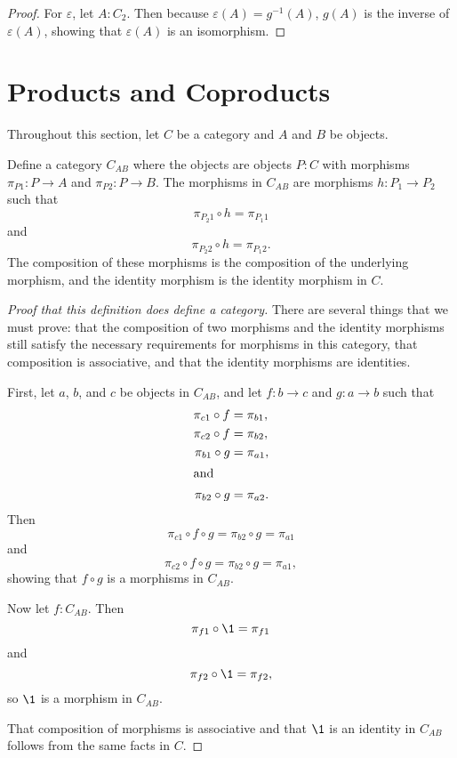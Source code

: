 \documentclass[../math.tex]{subfiles}
\begin{document}
\begin{proof}
    For $\varepsilon$, let $A : C_2$.  Then because $\varepsilon(A) =
    g^{-1}(A)$, $g(A)$ is the inverse of $\varepsilon(A)$, showing that
    $\varepsilon(A)$ is an isomorphism.
\end{proof}

\section{Products and Coproducts}

Throughout this section, let $C$ be a category and $A$ and $B$ be objects.

\begin{definition}
    Define a category $C_{AB}$ where the objects are objects $P : C$ with
    morphisms $\pi_{P1} : P \to A$ and $\pi_{P2} : P \to B$.  The morphisms in
    $C_{AB}$ are morphisms $h : P_1 \to P_2$ such that
    \[
        \pi_{P_2 1} \circ h = \pi_{P_1 1}
    \]
    and
    \[
        \pi_{P_2 2} \circ h = \pi_{P_1 2}.
    \]
    The composition of these morphisms is the composition of the underlying
    morphism, and the identity morphism is the identity morphism in $C$.
\end{definition}
\begin{proof}[Proof that this definition does define a category]
    There are several things that we must prove: that the composition of two
    morphisms and the identity morphisms still satisfy the necessary
    requirements for morphisms in this category, that composition is
    associative, and that the identity morphisms are identities.

    First, let $a$, $b$, and $c$ be objects in $C_{AB}$, and let $f : b \to c$
    and $g : a \to b$ such that
    \begin{align*}
        \pi_{c1} \circ f &= \pi_{b1}, \\
        \pi_{c2} \circ f &= \pi_{b2}, \\
        \pi_{b1} \circ g &= \pi_{a1}, \\
    \intertext{and}
        \pi_{b2} \circ g &= \pi_{a2}.
    \end{align*}
    Then
    \[
        \pi_{c1} \circ f \circ g = \pi_{b2} \circ g = \pi_{a1}
    \]
    and
    \[
        \pi_{c2} \circ f \circ g = \pi_{b2} \circ g = \pi_{a1},
    \]
    showing that $f \circ g$ is a morphisms in $C_{AB}$.

    Now let $f : C_{AB}$.  Then
    \[
        \pi_{f1} \circ \1 = \pi_{f1}
    \]
    and
    \[
        \pi_{f2} \circ \1 = \pi_{f2},
    \]
    so $\1$ is a morphism in $C_{AB}$.

    That composition of morphisms is associative and that $\1$ is an identity in
    $C_{AB}$ follows from the same facts in $C$.
\end{proof}
\end{document}
